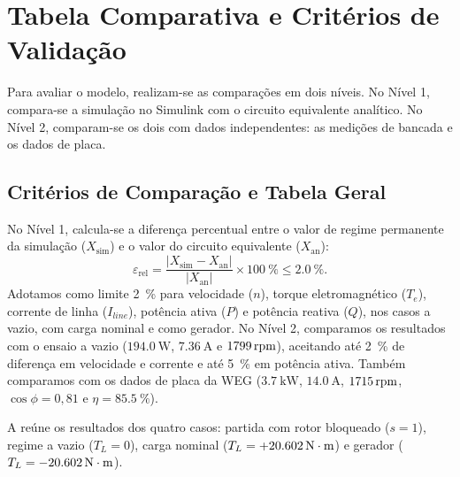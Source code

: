 \section{Tabela Comparativa e Critérios de Validação}\label{sec:auditoria_tolerancia}

Para avaliar o modelo, realizam-se as comparações em dois níveis. No Nível 1, compara-se a simulação no Simulink com o circuito equivalente analítico. No Nível 2, comparam-se os dois com dados independentes: as medições de bancada e os dados de placa.

\subsection{Critérios de Comparação e Tabela Geral}\label{subsec:matriz_validacao}

No Nível 1, calcula-se a diferença percentual entre o valor de regime permanente da simulação ($X_{\text{sim}}$) e o valor do circuito equivalente ($X_{\text{an}}$):
\begin{equation}
\varepsilon_{\text{rel}} = \frac{|X_{\text{sim}} - X_{\text{an}}|}{|X_{\text{an}}|} \times \SI{100}{\percent} \le \SI{2,0}{\percent}.
\label{eq:erro_relativo_auditoria}
\end{equation}
Adotamos como limite \SI{2}{\percent} para velocidade ($n$), torque eletromagnético ($T_e$), corrente de linha ($I_{line}$), potência ativa ($P$) e potência reativa ($Q$), nos casos a vazio, com carga nominal e como gerador. No Nível 2, comparamos os resultados com o ensaio a vazio ($\SI{194,0}{\watt}$, $\SI{7,36}{\ampere}$ e $\SI{1799}{\mathrm{rpm}}$), aceitando até \SI{2}{\percent} de diferença em velocidade e corrente e até \SI{5}{\percent} em potência ativa. Também comparamos com os dados de placa da WEG ($\SI{3,7}{\kilo\watt}$, $\SI{14,0}{\ampere}$, $\SI{1715}{\mathrm{rpm}}$, $\cos\phi = 0{,}81$ e $\eta = \SI{85,5}{\percent}$).

A  reúne os resultados dos quatro casos: partida com rotor bloqueado ($s = 1$), regime a vazio ($T_L = 0$), carga nominal ($T_L = +\SI{20,602}{\mathrm{N\cdot m}}$) e gerador ($T_L = -\SI{20,602}{\mathrm{N\cdot m}}$).


